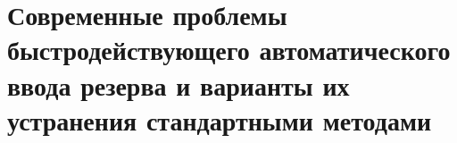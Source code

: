 \chapter{Современные проблемы быстродействующего автоматического ввода резерва и варианты их устранения стандартными методами}
\label{ch:bavr_problems}

























